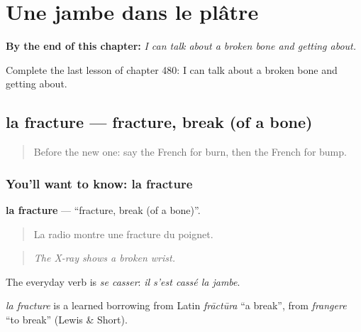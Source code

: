 
\chapter{Une jambe dans le plâtre}
\label{ch:fr-une-jambe-dans-le-platre}

\begin{chapteropening}
\textbf{By the end of this chapter:} \emph{I can talk about a broken bone and getting about.}

Complete the last lesson of chapter 480: I can talk about a broken bone and getting about.
\end{chapteropening}

\section[la fracture]{la fracture — fracture, break (of a bone)}

\label{lesson:FR-C480-fracture}



\begin{quote}
Before the new one: say the French for burn, then the French for bump.
\end{quote}

\subsection*{You'll want to know: la fracture}
\textbf{la fracture} — \textquotedblleft{}fracture, break (of a bone)\textquotedblright{}.

\begin{quote}
La radio montre une fracture du poignet.
\end{quote}

\begin{quote}
\emph{The X-ray shows a broken wrist.}
\end{quote}

The everyday verb is \emph{se casser}: \emph{il s'est cassé la jambe}.

\begin{cousinweb}
\emph{la fracture} is a learned borrowing from Latin \emph{frāctūra} \textquotedblleft{}a break\textquotedblright{}, from \emph{frangere} \textquotedblleft{}to break\textquotedblright{} (Lewis \& Short).
\end{cousinweb}

